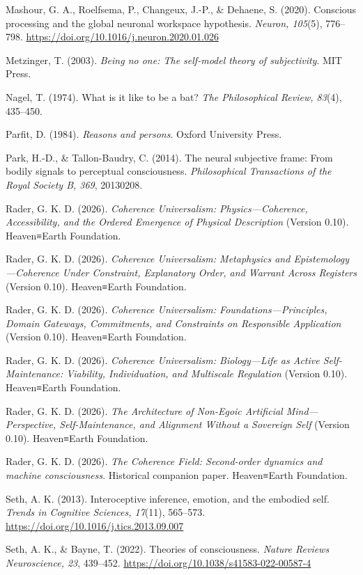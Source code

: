 \documentclass[
  11pt,
]{article}
\begin{document}
Mashour, G. A., Roelfsema, P., Changeux, J.-P., \& Dehaene, S. (2020).
Conscious processing and the global neuronal workspace hypothesis.
\emph{Neuron, 105}(5), 776--798.
\url{https://doi.org/10.1016/j.neuron.2020.01.026}

Metzinger, T. (2003). \emph{Being no one: The self-model theory of
subjectivity}. MIT Press.

Nagel, T. (1974). What is it like to be a bat? \emph{The Philosophical
Review, 83}(4), 435--450.

Parfit, D. (1984). \emph{Reasons and persons}. Oxford University Press.

Park, H.-D., \& Tallon-Baudry, C. (2014). The neural subjective frame:
From bodily signals to perceptual consciousness. \emph{Philosophical
Transactions of the Royal Society B, 369}, 20130208.

Rader, G. K. D. (2026). \emph{Coherence Universalism:
Physics---Coherence, Accessibility, and the Ordered Emergence of
Physical Description} (Version 0.10). Heaven≡Earth Foundation.

Rader, G. K. D. (2026). \emph{Coherence Universalism: Metaphysics and
Epistemology---Coherence Under Constraint, Explanatory Order, and
Warrant Across Registers} (Version 0.10). Heaven≡Earth Foundation.

Rader, G. K. D. (2026). \emph{Coherence Universalism:
Foundations---Principles, Domain Gateways, Commitments, and Constraints
on Responsible Application} (Version 0.10). Heaven≡Earth Foundation.

Rader, G. K. D. (2026). \emph{Coherence Universalism: Biology---Life as
Active Self-Maintenance: Viability, Individuation, and Multiscale
Regulation} (Version 0.10). Heaven≡Earth Foundation.

Rader, G. K. D. (2026). \emph{The Architecture of Non-Egoic Artificial
Mind---Perspective, Self-Maintenance, and Alignment Without a Sovereign
Self} (Version 0.10). Heaven≡Earth Foundation.

Rader, G. K. D. (2026). \emph{The Coherence Field: Second-order dynamics
and machine consciousness}. Historical companion paper. Heaven≡Earth
Foundation.

Seth, A. K. (2013). Interoceptive inference, emotion, and the embodied
self. \emph{Trends in Cognitive Sciences, 17}(11), 565--573.
\url{https://doi.org/10.1016/j.tics.2013.09.007}

Seth, A. K., \& Bayne, T. (2022). Theories of consciousness.
\emph{Nature Reviews Neuroscience, 23}, 439--452.
\url{https://doi.org/10.1038/s41583-022-00587-4}
\end{document}
